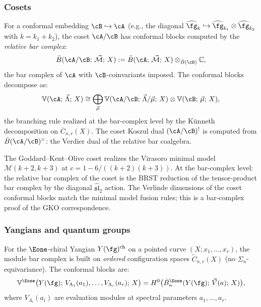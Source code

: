 \subsubsection{Cosets}

For a conformal embedding $\cB \hookrightarrow \cA$ (e.g.,
the diagonal $\widehat{\fg}_k \hookrightarrow
\widehat{\fg}_{k_1} \otimes \widehat{\fg}_{k_2}$ with
$k = k_1 + k_2$), the coset $\cA / \cB$ has conformal blocks
computed by the \emph{relative bar complex}:
\[
\bar{B}(\cA/\cB;\, \vec{\mathcal{M}};\, X)
:= \bar{B}(\cA;\, \vec{\mathcal{M}};\, X)
\otimes_{\bar{B}(\cB)} \mathbb{C},
\]
the bar complex of $\cA$ with $\cB$-coinvariants imposed.  The
conformal blocks decompose as:
\[
\mathbb{V}(\cA;\, \vec{\Lambda};\, X)
\cong \bigoplus_{\vec{\mu}}
\mathbb{V}(\cA/\cB;\, \vec{\Lambda}/\vec{\mu};\, X)
\otimes \mathbb{V}(\cB;\, \vec{\mu};\, X),
\]
the branching rule realized at the bar-complex level by the
Künneth decomposition on $\overline{C}_{n,r}(X)$.  The coset
Koszul dual $(\cA/\cB)^!$ is computed from
$\bar{B}(\cA/\cB)^\vee$: the Verdier dual of the relative bar
coalgebra.

\begin{example}
\label{ex:gko-coset-bar}
The Goddard--Kent--Olive coset realizes the Virasoro minimal
model $\mathcal{M}(k+2, k+3)$ at $c = 1 - 6/((k+2)(k+3))$.
At the bar-complex level: the relative bar complex of the coset
is the BRST reduction of the tensor-product bar complex by the
diagonal $\widehat{\mathfrak{sl}}_2$ action.  The Verlinde
dimensions of the coset conformal blocks match the minimal model
fusion rules; this is a bar-complex proof of the GKO correspondence.
\end{example}

\subsubsection{Yangians and quantum groups}

For the $\Eone$-chiral Yangian $Y(\fg)^{\mathrm{ch}}$ on a
pointed curve $(X; x_1, \ldots, x_r)$, the module bar complex
is built on \emph{ordered} configuration spaces
$\widetilde{C}_{n,r}(X)$ (no $\Sigma_n$-equivariance).  The
conformal blocks are:
\[
\mathbb{V}^{\Eone}\bigl(Y(\fg);\,
V_{\Lambda_1}(a_1), \ldots, V_{\Lambda_r}(a_r);\, X\bigr)
= H^0\bigl(\bar{B}^{\Eone}_n(Y(\fg);\,
\vec{V}(a);\, X)\bigr),
\]
where $V_{\Lambda_i}(a_i)$ are evaluation modules at spectral
parameters $a_1, \ldots, a_r$.

